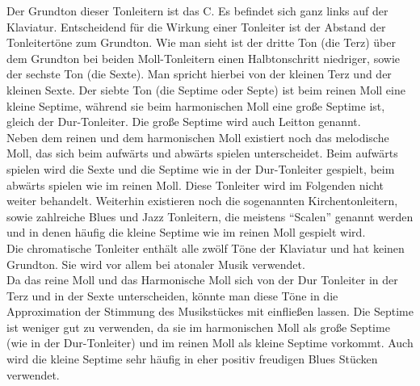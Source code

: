 \documentclass[11pt,a4paper]{article}
\begin{document}
Der Grundton dieser Tonleitern ist das C. Es befindet sich ganz links auf der Klaviatur. Entscheidend für die Wirkung einer Tonleiter ist der Abstand der Tonleitertöne zum Grundton. Wie man sieht ist der dritte Ton (die Terz) über dem Grundton bei beiden Moll-Tonleitern einen Halbtonschritt niedriger, sowie der sechste Ton (die Sexte). Man spricht hierbei von der kleinen Terz und der kleinen Sexte. Der siebte Ton (die Septime oder Septe) ist beim reinen Moll eine kleine Septime, während sie beim harmonischen Moll eine große Septime ist, gleich der Dur-Tonleiter. Die große Septime wird auch Leitton genannt.\\
Neben dem reinen und dem harmonischen Moll existiert noch das melodische Moll, das sich beim aufwärts und abwärts spielen unterscheidet. Beim aufwärts spielen wird die Sexte und die Septime wie in der Dur-Tonleiter gespielt, beim abwärts spielen wie im reinen Moll. Diese Tonleiter wird im Folgenden nicht weiter behandelt. Weiterhin existieren noch die sogenannten Kirchentonleitern, sowie zahlreiche Blues und Jazz Tonleitern, die meistens ``Scalen'' genannt werden und in denen häufig die kleine Septime wie im reinen Moll gespielt wird.\\
Die chromatische Tonleiter enthält alle zwölf Töne der Klaviatur und hat keinen Grundton. Sie wird vor allem bei atonaler Musik verwendet.\\
Da das reine Moll und das Harmonische Moll sich von der Dur Tonleiter in der Terz und in der Sexte unterscheiden, könnte man diese Töne in die Approximation der Stimmung des Musikstückes mit einfließen lassen. Die Septime ist weniger gut zu verwenden, da sie im harmonischen Moll als große Septime (wie in der Dur-Tonleiter) und im reinen Moll als kleine Septime vorkommt. Auch wird die kleine Septime sehr häufig in eher positiv freudigen Blues Stücken verwendet.

\end{document}
